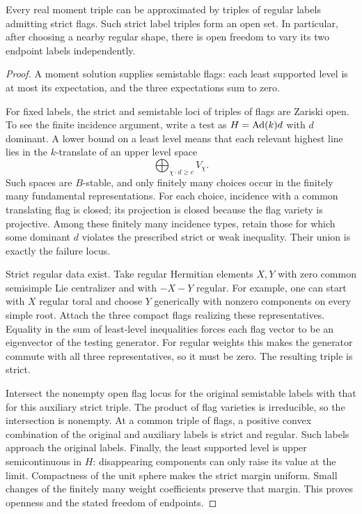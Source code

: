 \begin{lemma}\label{real:strict-approximation}
Every real moment triple can be approximated by triples of regular
labels admitting strict flags.  Such strict label triples form an
open set.  In particular, after choosing a nearby regular shape,
there is open freedom to vary its two endpoint labels independently.
\end{lemma}

\begin{proof}
A moment solution supplies semistable flags: each least supported
level is at most its expectation, and the three expectations sum
to zero.

For fixed labels, the strict and semistable loci of triples of flags
are Zariski open.  To see the finite incidence argument, write a test
as $H=\operatorname{Ad}(k)d$ with $d$ dominant.  A lower bound on a least level
means that each relevant highest line lies in the $k$-translate of an
upper level space
\[
 \bigoplus_{\chi\cdot d\ge c} V_\chi.
\]
Such spaces are $B$-stable, and only finitely many choices occur in
the finitely many fundamental representations.  For each choice,
incidence with a common translating flag is closed; its projection
is closed because the flag variety is projective.  Among these
finitely many incidence types, retain those for which some dominant
$d$ violates the prescribed strict or weak inequality.  Their union
is exactly the failure locus.

Strict regular data exist.  Take regular Hermitian elements $X,Y$
with zero common semisimple Lie centralizer and with $-X-Y$ regular.
For example, one can start with $X$ regular toral and choose $Y$
generically with nonzero components on every simple root.  Attach
the three compact flags realizing these representatives.  Equality
in the sum of least-level inequalities forces each flag vector to
be an eigenvector of the testing generator.  For regular weights
this makes the generator commute with all three representatives,
so it must be zero.  The resulting triple is strict.

Intersect the nonempty open flag locus for the original semistable
labels with that for this auxiliary strict triple.  The product of
flag varieties is irreducible, so the intersection is nonempty.
At a common triple of flags, a positive convex combination of the
original and auxiliary labels is strict and regular.  Such labels
approach the original labels.  Finally, the least supported level
is upper semicontinuous in $H$: disappearing components can only
raise its value at the limit.  Compactness of the unit sphere makes
the strict margin uniform.  Small changes of the finitely many
weight coefficients preserve that margin.  This proves openness
and the stated freedom of endpoints.
\end{proof}

